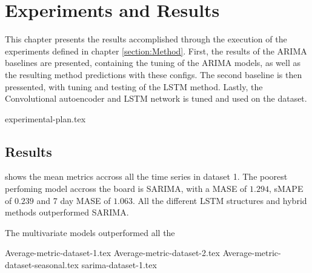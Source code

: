 \chapter{Experiments and Results}
\label{section:Results}

This chapter presents the results accomplished through the execution of the experiments defined in chapter \cref{section:Method}.
First, the results of the ARIMA baselines are presented, containing the tuning of the ARIMA models, as well as the resulting method predictions with these configs.
The second baseline is then pressented, with tuning and testing of the LSTM method.
Lastly, the Convolutional autoencoder and LSTM network is tuned and used on the dataset.


{experimental-plan.tex}



\section{Results}
 shows the mean metrics accross
all the time series in dataset 1. The poorest perfoming model accross the board
is SARIMA, with a MASE of $1.294$, sMAPE of $0.239$ and 7 day MASE of $1.063$.
All the different LSTM structures and hybrid methods outperformed SARIMA.

The multivariate models outperformed all the

{Average-metric-dataset-1.tex}
{Average-metric-dataset-2.tex}
{Average-metric-dataset-seasonal.tex}
{sarima-dataset-1.tex}

